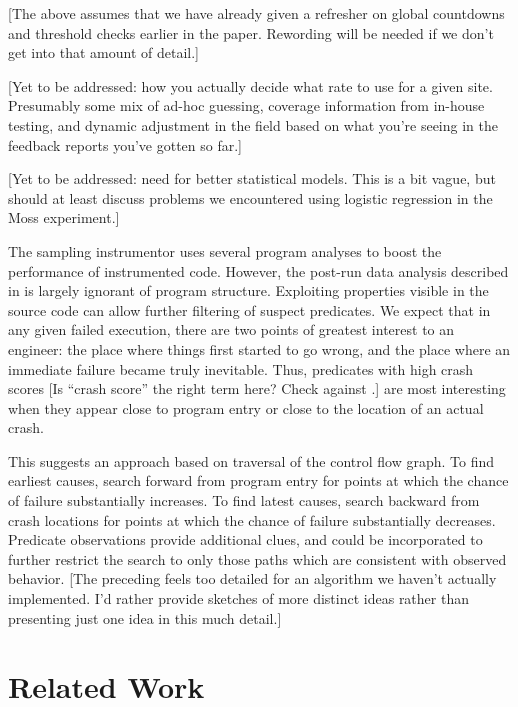 \documentclass{acm_proc_article-sp}
\newcommand{\placeholder}[1]{{\color[cmyk]{0,0.61,0.87,0}[#1]}}
\begin{document}
\placeholder{The above assumes that we have already given a refresher
  on global countdowns and threshold checks earlier in the paper.
  Rewording will be needed if we don't get into that amount of
  detail.}

\placeholder{Yet to be addressed: how you actually decide what rate to
  use for a given site.  Presumably some mix of ad-hoc guessing,
  coverage information from in-house testing, and dynamic adjustment
  in the field based on what you're seeing in the feedback reports
  you've gotten so far.}

\placeholder{Yet to be addressed: need for better statistical models.
  This is a bit vague, but should at least discuss problems we
  encountered using logistic regression in the Moss experiment.}

The sampling instrumentor uses several program analyses to boost the
performance of instrumented code.  However, the post-run data analysis
described in  is largely ignorant of program
structure.  Exploiting properties visible in the source code can allow
further filtering of suspect predicates.  We expect that in any given
failed execution, there are two points of greatest interest to an
engineer: the place where things first started to go wrong, and the
place where an immediate failure became truly inevitable.  Thus,
predicates with high crash scores \placeholder{Is ``crash score'' the
  right term here?  Check against \Autoref{sec:algorithm}.} are most
interesting when they appear close to program entry or close to the
location of an actual crash.

This suggests an approach based on traversal of the control flow
graph.  To find earliest causes, search forward from program entry for
points at which the chance of failure substantially increases.  To
find latest causes, search backward from crash locations for points at
which the chance of failure substantially decreases.  Predicate
observations provide additional clues, and could be incorporated to
further restrict the search to only those paths which are consistent
with observed behavior.  \placeholder{The preceding feels too detailed
  for an algorithm we haven't actually implemented.  I'd rather
  provide sketches of more distinct ideas rather than presenting just
  one idea in this much detail.}

\section{Related Work}
\label{sec:related-work}
\end{document}
